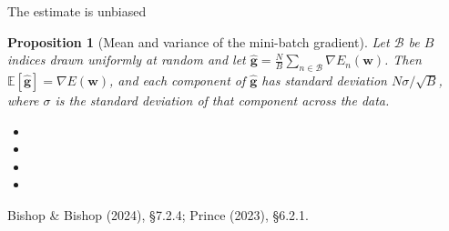 \documentclass[aspectratio=169, 11pt]{beamer}
\newtheorem{propx}[theorem]{Proposition}
\newcommand{\srcline}[1]{%
  \par\vspace{0.25em}%
  {\scriptsize\color{mcMuted}\hfill #1\par}}
\newcommand{\src}[3]{}      %
\begin{document}
\begin{frame}{The estimate is unbiased}
  \src{bishop2024}{section}{7.2.4}
  \src{prince2023}{section}{6.2.1}
  \vspace{-0.2em}
  \begin{propx}[Mean and variance of the mini-batch gradient]\label{th:mb}
    \small
    Let $\mathcal{B}$ be $B$ indices drawn uniformly at random and let
    $\hat{\mathbf{g}} = \tfrac{N}{B} \sum_{n \in \mathcal{B}} \nabla E_n(\mathbf{w})$. Then
    $\mathbb{E}[\hat{\mathbf{g}}] = \nabla E(\mathbf{w})$, and each component of $\hat{\mathbf{g}}$
    has standard deviation $N\sigma/\sqrt{B}$, where $\sigma$ is the
    standard deviation of that component across the data.
  \end{propx}
  \vspace{0.1em}
  {\footnotesize
  \begin{itemize}\itemsep0.28em
    \item {}
    \item {}
    \item {}
    \item {}
  \end{itemize}}
  \vspace{-0.3em}
  \srcline{Bishop \& Bishop (2024), \S7.2.4; Prince (2023), \S6.2.1.}
\end{frame}
\end{document}
